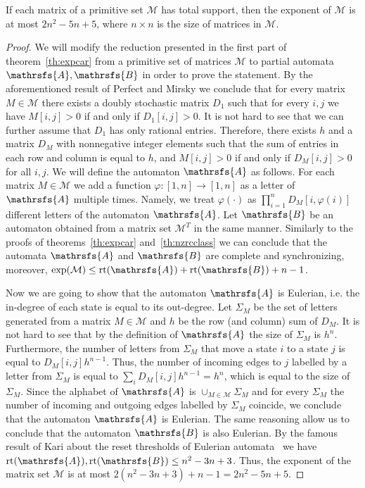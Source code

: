 \documentclass[a4paper,USenglish]{lipics}
\DeclareMathOperator{\rt}{rt}
\theoremstyle{definition}
\begin{document}
\begin{theorem}
If each matrix of a primitive set $\mathcal{M}$ has total support, then the exponent of $\mathcal{M}$ is at most $2n^2 -5n + 5$, where $n \times n$ is the size of matrices in $\mathcal{M}$.
\end{theorem}
\begin{proof}
We will modify the reduction presented in the first part of theorem~\ref{th:expcar} from a primitive set of matrices $\mathcal{M}$ to partial automata $\mathrsfs{A},\mathrsfs{B}$ in order to prove the statement. By the aforementioned result of Perfect and Mirsky we conclude that for every matrix $M \in \mathcal{M}$ there exists a doubly stochastic matrix $D_1$ such that for every $i,j$ we have $M[i,j]>0$ if and only if $D_1[i,j]>0$. It is not hard to see that we can further assume that $D_1$ has only rational entries. Therefore, there exists $h$ and a matrix $D_M$ with nonnegative integer elements such that the sum of entries in each row and column is equal to $h$, and $M[i,j]>0$ if and only if $D_M[i,j]>0$ for all $i,j$.  We will define the automaton $\mathrsfs{A}$ as follows. For each matrix $M \in \mathcal{M}$ we add a function $\varphi : [1,n] \rightarrow [1,n]$ as a letter of $\mathrsfs{A}$ multiple times. Namely, we treat $\varphi(\cdot)$ as $\prod_{i=1}^{n} D_M[i, \varphi(i)]$ different letters of the automaton $\mathrsfs{A}$. Let $\mathrsfs{B}$ be an automaton obtained from a matrix set $\mathcal{M}^T$ in the same manner. Similarly to the proofs of theorems~\ref{th:expcar} and~\ref{th:nzrcclass} we can conclude that the automata $\mathrsfs{A}$ and $\mathrsfs{B}$ are complete and synchronizing, moreover, $\exp(\mathcal{M}) \leq \rt(\mathrsfs{A}) + \rt(\mathrsfs{B}) + n - 1$.

Now we are going to show that the automaton $\mathrsfs{A}$ is Eulerian, i.e. the in-degree of each state is equal to its out-degree. Let $\Sigma_M$ be the set of letters generated from a matrix $M \in \mathcal{M}$ and $h$ be the row (and column) sum of $D_M$. It is not hard to see that by the definition of $\mathrsfs{A}$ the size of $\Sigma_M$ is $h^n$. Furthermore, the number of letters from $\Sigma_M$ that move a state $i$ to a state $j$ is equal to $D_M[i,j]h^{n-1}$. Thus, the number of incoming edges to $j$ labelled by a letter from $\Sigma_M$ is equal to $\sum_{i}D_M[i,j]h^{n-1}=h^n$, which is equal to the size of $\Sigma_M$. Since the alphabet of $\mathrsfs{A}$ is $\cup_{M \in \mathcal{M}} \Sigma_M$ and for every $\Sigma_M$ the number of incoming and outgoing edges labelled by $\Sigma_M$ coincide, we conclude that the automaton $\mathrsfs{A}$ is Eulerian. The same reasoning allow us to conclude that the automaton $\mathrsfs{B}$ is also Eulerian.
By the famous result of Kari about the reset thresholds of Eulerian automata~\cite{Kari2003Eulerian} we have $\rt(\mathrsfs{A}),\rt(\mathrsfs{B}) \leq n^2 - 3n + 3$. Thus, the exponent of the matrix set $\mathcal{M}$ is at most $2 (n^2 -3n + 3) + n-1 = 2n^2 -5n + 5$.
\end{proof}
\end{document}
